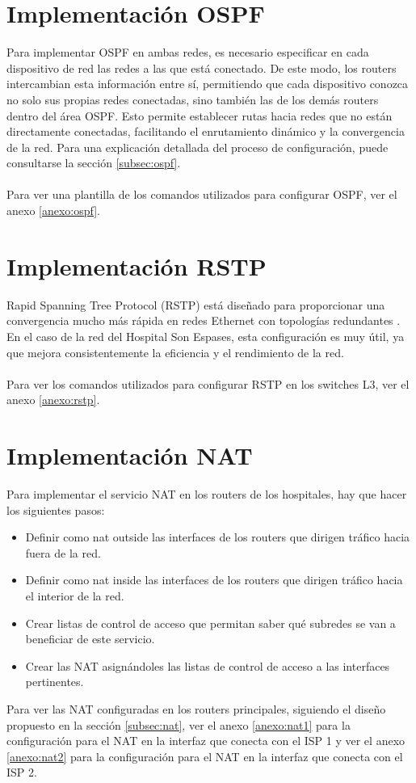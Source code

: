 \section{Implementación OSPF}
Para implementar OSPF en ambas redes, es necesario especificar en cada dispositivo de red las redes a las que está conectado. De este modo, los routers intercambian esta información entre sí, permitiendo que cada dispositivo conozca no solo sus propias redes conectadas, sino también las de los demás routers dentro del área OSPF. Esto permite establecer rutas hacia redes que no están directamente conectadas, facilitando el enrutamiento dinámico y la convergencia de la red.
Para una explicación detallada del proceso de configuración, puede consultarse la sección \ref{subsec:ospf}.
\\ \\
Para ver una plantilla de los comandos utilizados para configurar OSPF, ver el anexo \ref{anexo:ospf}.

\section{Implementación RSTP}
Rapid Spanning Tree Protocol (RSTP) está diseñado para proporcionar una convergencia mucho más rápida en redes Ethernet con topologías redundantes \cite{cisco_rstp_8021w}. En el caso de la red del Hospital Son Espases, esta configuración es muy útil, ya que mejora consistentemente la eficiencia y el rendimiento de la red.
\\ \\
Para ver los comandos utilizados para configurar RSTP en los switches L3, ver el anexo \ref{anexo:rstp}.

\section{Implementación NAT}
Para implementar el servicio NAT en los routers de los hospitales, hay que hacer los siguientes pasos:
\begin{itemize}
    \item Definir como nat outside las interfaces de los routers que dirigen tráfico hacia fuera de la red.
    \item Definir como nat inside las interfaces de los routers que dirigen tráfico hacia el interior de la red.
    \item Crear listas de control de acceso que permitan saber qué subredes se van a beneficiar de este servicio.
    \item Crear las NAT asignándoles las listas de control de acceso a las interfaces pertinentes.
\end{itemize}
Para ver las NAT configuradas en los routers principales, siguiendo el diseño propuesto en la sección \ref{subsec:nat}, ver el anexo \ref{anexo:nat1} para la configuración para el NAT en 
la interfaz que conecta con el ISP 1 y ver el anexo \ref{anexo:nat2} para la configuración para el NAT en la interfaz que conecta con el ISP 2.

